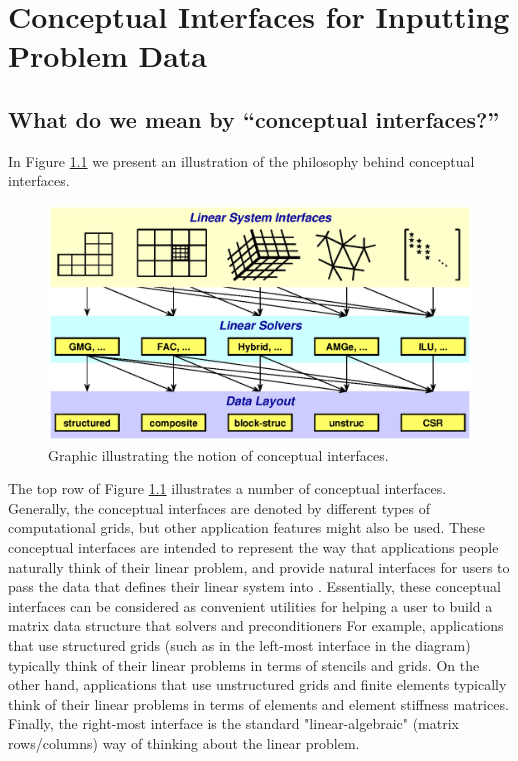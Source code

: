 \chapter{Conceptual Interfaces for Inputting Problem Data}
\label{Conceptual Interfaces}

\section{What do we mean by ``conceptual interfaces?''}

In Figure \ref{fig-conceptual-interface} we present an illustration
of the philosophy behind conceptual interfaces.


\begin{figure}
\centering
\includegraphics[width=5in]{concep_iface.eps}
\caption{%
Graphic illustrating the notion of conceptual interfaces.}
\label{fig-conceptual-interface}
\end{figure}

The top row of Figure \ref{fig-conceptual-interface} 
illustrates a number of conceptual interfaces.  Generally,
the conceptual interfaces are denoted by different types of computational
grids,  but other application features might also be used.  
These conceptual interfaces are intended to represent the
way that applications people naturally think of their linear problem, and
provide natural interfaces for users to pass the data that defines
their linear system into \hypre{}. 
Essentially, these conceptual interfaces can be considered as 
convenient utilities for helping a user to build a matrix data structure
that \hypre{} solvers and preconditioners 
For
example, applications that use structured grids (such as in the left-most
interface in the diagram) typically think of their linear problems in terms of
stencils and grids.  On the other hand, applications that use unstructured
grids and finite elements typically think of their linear problems in terms of
elements and element stiffness matrices.  Finally, the right-most interface is
the standard "linear-algebraic" (matrix rows/columns) way of thinking about the
linear problem.


